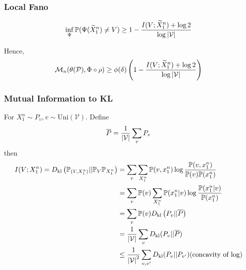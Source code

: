 \documentclass[10pt,xcolor={usenames,dvipsnames,table},aspectratio=169]{beamer}
\begin{document}
\begin{frame}
    \frametitle{Local Fano}
    \begin{lemma}
        \[
        \inf_{\Psi} \mathbb{P}(\Psi(\widetilde{X}_1^{n}) \neq V) \geq 1-\dfrac{I(V; \widetilde{X}_1^{n}) + \log 2}{\log \left\lvert\mathcal{V}\right\rvert}
        \] 
    \end{lemma}
    Hence,
    \[
    \mathcal{M}_n(\theta(\mathcal{P}), \Phi \circ \rho) \geq \phi(\delta)  \left( 1 - \dfrac{I(V; \widetilde{X}_1^{n}) + \log 2}{\log \left\lvert\mathcal{V}\right\rvert} \right)
    \] 
\end{frame}
\begin{frame}
    \frametitle{Mutual Information to KL}
        For $X_1^{n} \sim P_v, v \sim \text{Uni}(\mathcal{V})$. 
        Define
        \[
        \overline{P} = \dfrac{1}{\left\lvert\mathcal{V}\right\rvert} \sum_{v}  P_v
        \] 
        then
        \begin{align*}
        I(V; X_1^{n}) = D_{\rm kl} \left(  \mathbb{P}_{(V, X_1^{n})} || \mathbb{P}_V \mathbb{P}_{X_{1}^{n}}\right)
        &= \sum_{v} \sum_{X_1^{n}} \mathbb{P}(v, x_{1}^{n}) \log \dfrac{ \mathbb{P} (v, x_1^{n})}{ \mathbb{P}(v) \mathbb{P}(x_1^{n})} \\
        &= \sum_{v} \mathbb{P}(v) \sum_{X_1^{n}} \mathbb{P}(x_{1}^{n} | v) \log \dfrac{ \mathbb{P} (x_1^{n}|v)}{ \mathbb{P}(x_1^{n})} \\
        &= \sum_{v} \mathbb{P}(v) D_{\rm kl} \left( P_v || \overline{P} \right) \\
        &=\dfrac{1}{\left\lvert\mathcal{V}\right\rvert} \sum_{v} D_{\rm kl} (P_v || \overline{P}) \\
        &\leq \dfrac{1}{\left\lvert\mathcal{V}\right\rvert^2} \sum_{v, v'} D_{\rm kl} (P_v || P_{v'})  \text{(concavity of $\log$)}
        \end{align*} 

        
    \end{frame}
\end{document}
